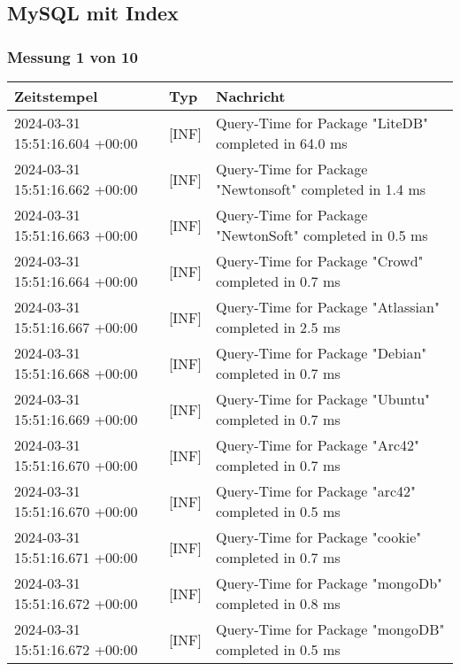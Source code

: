 \subsection{MySQL mit Index} \label{subsec:MySQLMitIndex}
    \subsubsection*{Messung 1 von 10} \label{subsubsec:MySQLMitIndex1von10}
        {
            {\small
                \begin{tabularx}{\textwidth}{|l|l|X|}
                    \hline
                    \textbf{Zeitstempel} & \textbf{Typ} & \textbf{Nachricht} \\
                    \hline
                    \endhead
                    2024-03-31 15:51:16.604 +00:00 & [INF] & Query-Time for Package "LiteDB" completed in 64.0 ms \\
                    2024-03-31 15:51:16.662 +00:00 & [INF] & Query-Time for Package "Newtonsoft" completed in 1.4 ms \\
                    2024-03-31 15:51:16.663 +00:00 & [INF] & Query-Time for Package "NewtonSoft" completed in 0.5 ms \\
                    2024-03-31 15:51:16.664 +00:00 & [INF] & Query-Time for Package "Crowd" completed in 0.7 ms \\
                    2024-03-31 15:51:16.667 +00:00 & [INF] & Query-Time for Package "Atlassian" completed in 2.5 ms \\
                    2024-03-31 15:51:16.668 +00:00 & [INF] & Query-Time for Package "Debian" completed in 0.7 ms \\
                    2024-03-31 15:51:16.669 +00:00 & [INF] & Query-Time for Package "Ubuntu" completed in 0.7 ms \\
                    2024-03-31 15:51:16.670 +00:00 & [INF] & Query-Time for Package "Arc42" completed in 0.7 ms \\
                    2024-03-31 15:51:16.670 +00:00 & [INF] & Query-Time for Package "arc42" completed in 0.5 ms \\
                    2024-03-31 15:51:16.671 +00:00 & [INF] & Query-Time for Package "cookie" completed in 0.7 ms \\
                    2024-03-31 15:51:16.672 +00:00 & [INF] & Query-Time for Package "mongoDb" completed in 0.8 ms \\
                    2024-03-31 15:51:16.672 +00:00 & [INF] & Query-Time for Package "mongoDB" completed in 0.5 ms \\

\end{tabularx}}}
